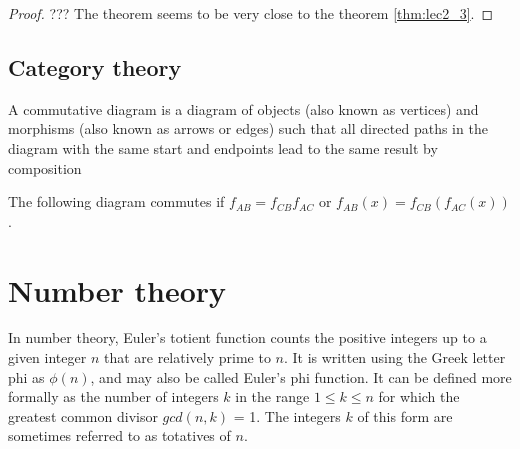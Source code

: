 \begin{appendices}
\begin{theorem}
\begin{proof}
    ??? The theorem seems to be very close to the theorem
    \ref{thm:lec2_3}. 
  \end{proof}
  
  \label{thm:isomorphismextension}
\end{theorem}

\subsection{Category theory}

\begin{definition}
  A commutative diagram is a diagram of objects (also known as
  vertices) and morphisms (also known as arrows or edges) such that
  all directed paths in the diagram with the same start and endpoints
  lead to the same result by composition
  \label{def:commutativediagram}

  The following diagram commutes if $f_{AB} = f_{CB} f_{AC}$ or
  $f_{AB}\left(x\right) = f_{CB} \left(f_{AC}\left(x\right)\right)$.

\end{definition}

\section{Number theory}

\begin{definition}
  In number theory, Euler's totient function counts the positive
  integers up to a given integer $n$ that are relatively prime to $n$. It
  is written using the Greek letter phi as $\phi\left(n\right)$, and
  may also be called Euler's phi function. It can be defined more formally as
  the number of integers $k$ in the range $1 \le k \le n$ for which the
  greatest common divisor $gcd\left(n, k\right)$ = 1. The integers $k$ of this
  form are sometimes referred to as totatives of $n$.


\end{definition}
\end{appendices}
